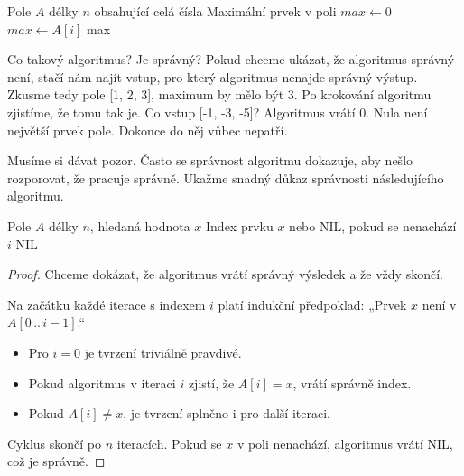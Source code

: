 \documentclass[openany,12pt,a4paper]{book}
\begin{document}
\begin{algorithm}
\caption{Algoritmus pro nalezení maxima pole}
\begin{algorithmic}[1]
\Require Pole $A$ délky $n$ obsahující celá čísla
\Ensure Maximální prvek v poli
\State $max \gets 0$
        \State $max \gets A[i]$
    \EndIf
\EndFor
\State \Return max
\end{algorithmic}
\end{algorithm}

Co takový algoritmus? Je správný? 
Pokud chceme ukázat, že algoritmus správný není, stačí nám najít vstup, pro který algoritmus nenajde správný výstup. Zkusme tedy pole [1, 2, 3], maximum by mělo být 3. Po krokování algoritmu zjistíme, že tomu tak je.
Co vstup [-1, -3, -5]? Algoritmus vrátí 0. Nula není největší prvek pole. Dokonce do něj vůbec nepatří.

Musíme si dávat pozor. Často se správnost algoritmu dokazuje, aby nešlo rozporovat, že pracuje správně.
Ukažme snadný důkaz správnosti následujícího algoritmu.

\begin{algorithm}
\caption{Lineární vyhledávání}
\begin{algorithmic}[1]
\Require Pole $A$ délky $n$, hledaná hodnota $x$
\Ensure Index prvku $x$ nebo \textsc{NIL}, pokud se nenachází
        \State \Return $i$
    \EndIf
\EndFor
\State \Return \textsc{NIL}
\end{algorithmic}
\end{algorithm}

\begin{proof}
Chceme dokázat, že algoritmus vrátí správný výsledek a že vždy skončí.

Na začátku každé iterace s indexem $i$ platí indukční předpoklad:  
„Prvek $x$ není v $A[0\,..\,i-1]$.“

\begin{itemize}
  \item Pro $i=0$ je tvrzení triviálně pravdivé.
  \item Pokud algoritmus v iteraci $i$ zjistí, že $A[i] = x$, vrátí správně index.
  \item Pokud $A[i] \neq x$, je tvrzení splněno i pro další iteraci.
\end{itemize}

Cyklus skončí po $n$ iteracích. Pokud se $x$ v poli nenachází, algoritmus vrátí \textsc{NIL}, což je správně.
\end{proof}
\end{document}
